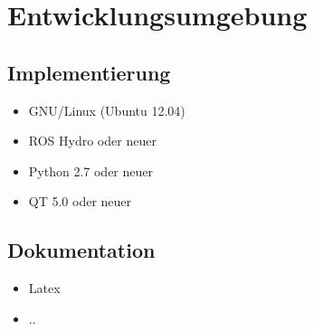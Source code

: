 \chapter{Entwicklungsumgebung}

\section{Implementierung}

\begin{itemize}
  \item GNU/Linux (Ubuntu 12.04)
  \item ROS Hydro oder neuer
  \item Python 2.7 oder neuer
  \item QT 5.0 oder neuer
\end{itemize}

\section{Dokumentation}

\begin{itemize}
  \item Latex
  \item ..
\end{itemize}